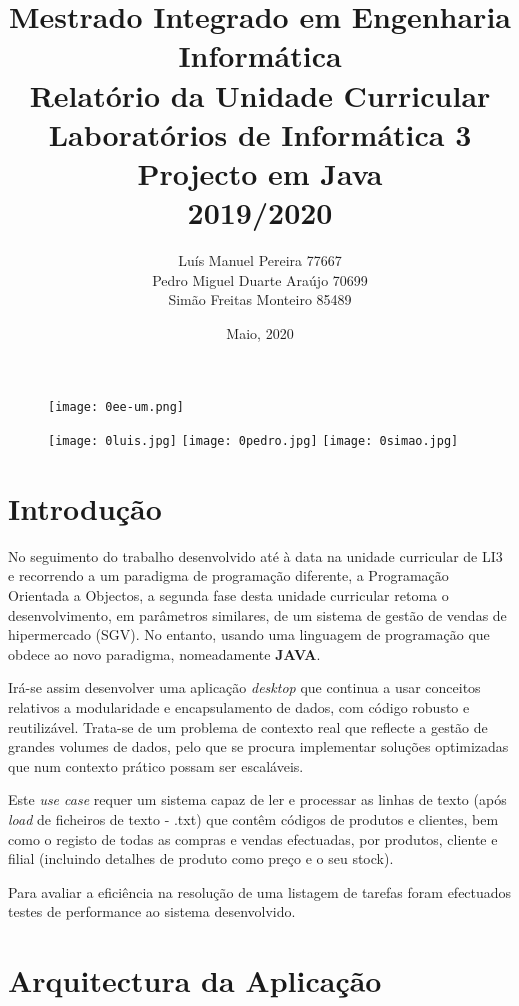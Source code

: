 \documentclass{article}
\title{Mestrado Integrado em Engenharia Informática \\ Relatório da Unidade Curricular \\ Laboratórios de Informática 3 \\ Projecto em Java \\ 2019/2020}
\author{Luís Manuel Pereira 77667 \\ Pedro Miguel Duarte Araújo 70699 \\ Simão Freitas Monteiro  85489}
\date{Maio, 2020}
\begin{document}
\begin{figure}[!t]
\texttt{[image: 0ee-um.png]}
\centering
\end{figure}

\begin{figure}[!b]
\texttt{[image: 0luis.jpg]} %
\endminipage\hfill
{}
\texttt{[image: 0pedro.jpg]}
\endminipage\hfill
{}%
\texttt{[image: 0simao.jpg]}
\endminipage
\end{figure}

\maketitle
\newpage
\tableofcontents

\newpage
\section{Introdução}\label{sec:intro}

No seguimento do trabalho desenvolvido até à data na unidade curricular de LI3 e recorrendo a um paradigma de programação diferente, a Programação Orientada a Objectos, a segunda fase desta unidade curricular retoma o desenvolvimento, em parâmetros similares, de um sistema de gestão de vendas de hipermercado (SGV). No entanto, usando uma linguagem de programação que obdece ao novo paradigma, nomeadamente \textbf{JAVA}.

Irá-se assim desenvolver uma aplicação \textit{desktop} que continua a usar conceitos relativos a modularidade e encapsulamento de dados, com código robusto e reutilizável. Trata-se de um problema de contexto real que reflecte a gestão de grandes volumes de dados, pelo que se procura implementar soluções optimizadas que num contexto prático possam ser escaláveis.

Este \textit{use case} requer um sistema capaz de ler e processar as linhas de texto (após \textit{load} de ficheiros de texto - .txt) que contêm códigos de produtos e clientes, bem como o registo de todas as compras e vendas efectuadas, por produtos, cliente e filial (incluindo detalhes de produto como preço e o seu stock). 

Para avaliar a eficiência na resolução de uma listagem de tarefas foram efectuados testes de performance ao sistema desenvolvido. 

\newpage

\section{Arquitectura da Aplicação}\label{sec:arqaplic}
\end{document}
